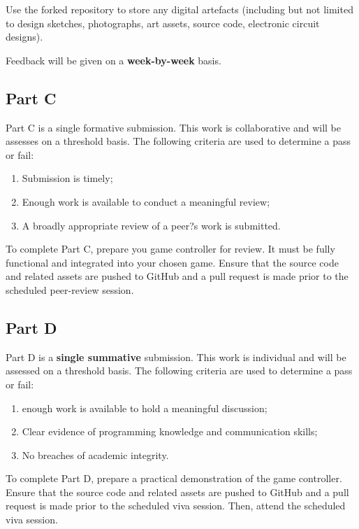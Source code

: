 \documentclass{../fal_assignment}
\begin{document}
Use the forked repository to store any digital artefacts (including but not limited to design sketches, photographs, art assets, source code, electronic circuit designs). 

Feedback will be given on a \textbf{week-by-week} basis. 

\subsection*{Part C}

Part C is a single formative submission. This work is collaborative and will be assesses on a threshold basis. The following criteria are used to determine a pass or fail:
\begin{enumerate}[label=(\alph*)]
	\item Submission is timely;
	\item Enough work is available to conduct a meaningful review;
	\item A broadly appropriate review of a peer?s work is submitted.
\end{enumerate}

To complete Part C, prepare you game controller for review. It must be fully functional and integrated into your chosen game.  Ensure that the source code and related assets are pushed to GitHub and a pull request is made prior to the scheduled peer-review session.

\subsection*{Part D}

Part D is a \textbf{single summative} submission. This work is individual and will be assessed on a threshold basis. The following criteria are used to determine a pass or fail: 

\begin{enumerate}[label=(\alph*)]
	\item enough work is available to hold a meaningful discussion; 
	\item Clear evidence of programming knowledge and communication skills; 
	\item No breaches of academic integrity. 
\end{enumerate}

To complete Part D, prepare a practical demonstration of the game controller. Ensure that the source code and related assets are pushed to GitHub and a pull request is made prior to the scheduled viva session. Then, attend the scheduled viva session. 
\end{document}
